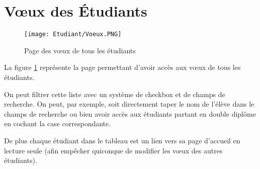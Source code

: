 \section{Vœux des Étudiants}
\label{sec::stud_wish}


\begin{figure}[H]
	\texttt{[image: Etudiant/Voeux.PNG]}
	\caption{Page des vœux de tous les étudiants}
	\label{fig::list_wish}
\end{figure}


La figure \ref{fig::list_wish} représente la page permettant d'avoir accès aux vœux de tous les étudiants.

On peut filtrer cette liste avec un système de checkbox et de champs de recherche. On peut, par exemple, soit directement taper le nom de l'élève dans le champs de recherche ou bien avoir accès aux étudiants partant en double diplôme en cochant la case correspondante.
\bigbreak

De plus chaque étudiant dans le tableau est un lien vers sa page d'accueil en lecture seule (afin empêcher quiconque de modifier les vœux des autres étudiants).

